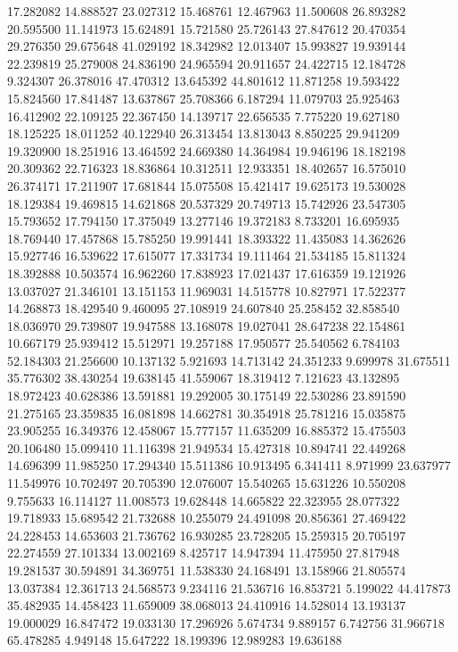 17.282082
14.888527
23.027312
15.468761
12.467963
11.500608
26.893282
20.595500
11.141973
15.624891
15.721580
25.726143
27.847612
20.470354
29.276350
29.675648
41.029192
18.342982
12.013407
15.993827
19.939144
22.239819
25.279008
24.836190
24.965594
20.911657
24.422715
12.184728
9.324307
26.378016
47.470312
13.645392
44.801612
11.871258
19.593422
15.824560
17.841487
13.637867
25.708366
6.187294
11.079703
25.925463
16.412902
22.109125
22.367450
14.139717
22.656535
7.775220
19.627180
18.125225
18.011252
40.122940
26.313454
13.813043
8.850225
29.941209
19.320900
18.251916
13.464592
24.669380
14.364984
19.946196
18.182198
20.309362
22.716323
18.836864
10.312511
12.933351
18.402657
16.575010
26.374171
17.211907
17.681844
15.075508
15.421417
19.625173
19.530028
18.129384
19.469815
14.621868
20.537329
20.749713
15.742926
23.547305
15.793652
17.794150
17.375049
13.277146
19.372183
8.733201
16.695935
18.769440
17.457868
15.785250
19.991441
18.393322
11.435083
14.362626
15.927746
16.539622
17.615077
17.331734
19.111464
21.534185
15.811324
18.392888
10.503574
16.962260
17.838923
17.021437
17.616359
19.121926
13.037027
21.346101
13.151153
11.969031
14.515778
10.827971
17.522377
14.268873
18.429540
9.460095
27.108919
24.607840
25.258452
32.858540
18.036970
29.739807
19.947588
13.168078
19.027041
28.647238
22.154861
10.667179
25.939412
15.512971
19.257188
17.950577
25.540562
6.784103
52.184303
21.256600
10.137132
5.921693
14.713142
24.351233
9.699978
31.675511
35.776302
38.430254
19.638145
41.559067
18.319412
7.121623
43.132895
18.972423
40.628386
13.591881
19.292005
30.175149
22.530286
23.891590
21.275165
23.359835
16.081898
14.662781
30.354918
25.781216
15.035875
23.905255
16.349376
12.458067
15.777157
11.635209
16.885372
15.475503
20.106480
15.099410
11.116398
21.949534
15.427318
10.894741
22.449268
14.696399
11.985250
17.294340
15.511386
10.913495
6.341411
8.971999
23.637977
11.549976
10.702497
20.705390
12.076007
15.540265
15.631226
10.550208
9.755633
16.114127
11.008573
19.628448
14.665822
22.323955
28.077322
19.718933
15.689542
21.732688
10.255079
24.491098
20.856361
27.469422
24.228453
14.653603
21.736762
16.930285
23.728205
15.259315
20.705197
22.274559
27.101334
13.002169
8.425717
14.947394
11.475950
27.817948
19.281537
30.594891
34.369751
11.538330
24.168491
13.158966
21.805574
13.037384
12.361713
24.568573
9.234116
21.536716
16.853721
5.199022
44.417873
35.482935
14.458423
11.659009
38.068013
24.410916
14.528014
13.193137
19.000029
16.847472
19.033130
17.296926
5.674734
9.889157
6.742756
31.966718
65.478285
4.949148
15.647222
18.199396
12.989283
19.636188
